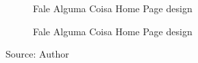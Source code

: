 \begin{figure}[ht]
\begin{subfigure}{.5\textwidth}
      \caption{Fale Alguma Coisa Home Page design}
      \label{fig:falealgumacoisa-splash-page-design}
    \end{subfigure}%
    \begin{subfigure}{.5\textwidth}
      \centering
      \caption{Fale Alguma Coisa Home Page design}
      \label{fig:falealgumacoisa-home-page-design}
    \end{subfigure}
    \caption*{Source: Author}
    \label{fig:falealgumacoisa-home-page-designs}
\end{figure}

